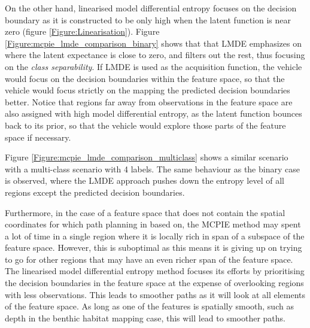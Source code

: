 			On the other hand, linearised model differential entropy focuses on the decision boundary as it is constructed to be only high when the latent function is near zero (figure \ref{Figure:Linearisation}). Figure \ref{Figure:mcpie_lmde_comparison_binary} shows that that LMDE emphasizes on where the latent expectance is close to zero, and filters out the rest, thus focusing on the \textit{class separability}. If LMDE is used as the acquisition function, the vehicle would focus on the decision boundaries within the feature space, so that the vehicle would focus strictly on the mapping the predicted decision boundaries better. Notice that regions far away from observations in the feature space are also assigned with high model differential entropy, as the latent function bounces back to its prior, so that the vehicle would explore those parts of the feature space if necessary.
			
			Figure \ref{Figure:mcpie_lmde_comparison_multiclass} shows a similar scenario with a multi-class scenario with 4 labels. The same behaviour as the binary case is observed, where the LMDE approach pushes down the entropy level of all regions except the predicted decision boundaries.

			Furthermore, in the case of a feature space that does not contain the spatial coordinates for which path planning in based on, the MCPIE method may spent a lot of time in a single region where it is locally rich in span of a subspace of the feature space. However, this is suboptimal as this means it is giving up on trying to go for other regions that may have an even richer span of the feature space. The linearised model differential entropy method focuses its efforts by prioritising the decision boundaries in the feature space at the expense of overlooking regions with less observations. This leads to smoother paths as it will look at all elements of the feature space. As long as one of the features is spatially smooth, such as depth in the benthic habitat mapping case, this will lead to smoother paths.
	
	


